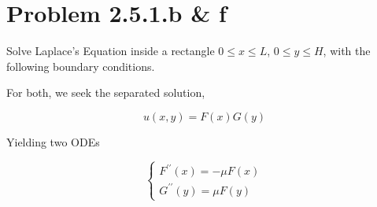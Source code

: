 \documentclass[10pt]{article}
\begin{document}
\newpage
\section{Problem 2.5.1.b \& f}

Solve Laplace's Equation inside a rectangle $0 \le x \le L$, $0 \le y \le H$, with the following boundary conditions.

For both, we seek the separated solution,

\[
    u(x, y) = F(x)G(y)
\]

Yielding two ODEs

\[
    \begin{cases}
        F^{\prime\prime}(x) = -\mu F(x)\\
        G^{\prime\prime}(y) = \mu F(y)
    \end{cases}
\]
\end{document}
